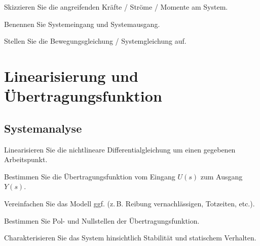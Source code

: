 \documentclass[a4paper,11pt]{scrartcl}
\begin{document}
\begin{aufgaben}
    \item Skizzieren Sie die angreifenden Kräfte / Ströme / Momente am System.
    \item Benennen Sie Systemeingang und Systemausgang.
    \item Stellen Sie die Bewegungsgleichung / Systemgleichung auf.
\end{aufgaben}

\begin{answerboxfillpage}
\end{answerboxfillpage}

\section{Linearisierung und Übertragungsfunktion}

\subsection*{Systemanalyse}

\begin{aufgaben}
    \item Linearisieren Sie die nichtlineare Differentialgleichung um einen gegebenen Arbeitspunkt.
    \item Bestimmen Sie die Übertragungsfunktion vom Eingang $U(s)$ zum Ausgang $Y(s)$.
    \item Vereinfachen Sie das Modell ggf. (z.\,B. Reibung vernachlässigen, Totzeiten, etc.).
    \item Bestimmen Sie Pol- und Nullstellen der Übertragungsfunktion.
    \item Charakterisieren Sie das System hinsichtlich Stabilität und statischem Verhalten.
\end{aufgaben}

\begin{answerboxfillpage}
\end{answerboxfillpage}

\begin{answerbox}[8]
\end{answerbox}

\end{document}
